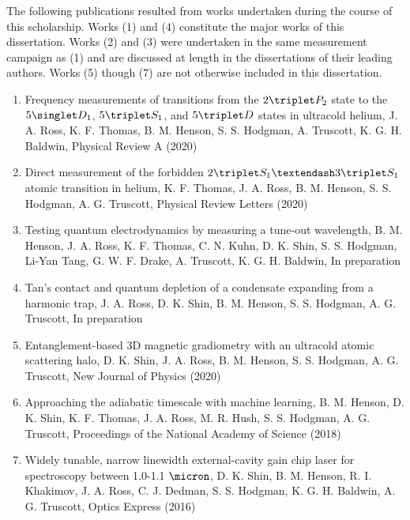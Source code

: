 The following publications resulted from works undertaken during the course of this scholarship. Works (1) and (4) constitute the major works of this dissertation. Works (2) and (3) were undertaken in the same measurement campaign as (1) and are discussed at length in the dissertations of their leading authors. Works (5) though (7) are not otherwise included in this dissertation.

\begin{enumerate}
\item{Frequency measurements of transitions from the $2\triplet P_2$ state to the $5 \singlet D_1$, $5\triplet S_1$, and $5\triplet D$ states in ultracold helium, J. A. Ross, K. F. Thomas, B. M. Henson, S. S. Hodgman, A. Truscott, K. G. H. Baldwin, {Physical Review A} (2020) }
\item{Direct measurement of the forbidden $2\triplet S_1 – 3\triplet S_1$ atomic transition in helium,  K. F. Thomas, J. A. Ross, B. M. Henson, S. S. Hodgman, A. G. Truscott, {Physical Review Letters} (2020)}
\item{Testing quantum electrodynamics by measuring a \mhe tune-out wavelength, B. M. Henson, J. A. Ross, K. F. Thomas, C. N. Kuhn, D. K. Shin, S. S. Hodgman, Li-Yan Tang, G. W. F. Drake, A. Truscott, K. G. H. Baldwin, {In preparation}}
\item{Tan's contact and quantum depletion of a condensate expanding from a harmonic trap, J. A. Ross, D. K. Shin, B. M. Henson, S. S. Hodgman, A. G. Truscott, {In preparation}}
\item{Entanglement-based 3D magnetic gradiometry with an ultracold atomic scattering halo, D. K. Shin, J. A. Ross, B. M. Henson, S. S. Hodgman, A. G. Truscott, New Journal of Physics (2020)}
\item{Approaching the adiabatic timescale with machine learning, B. M. Henson, D. K. Shin, K. F. Thomas, J. A. Ross, M. R. Hush, S. S. Hodgman, A. G. Truscott, {Proceedings of the National Academy of Science} (2018)}
\item{Widely tunable, narrow linewidth external-cavity gain chip laser for spectroscopy between 1.0-1.1 $\micron$, D. K. Shin, B. M. Henson, R. I.  Khakimov, J. A. Ross, C. J.  Dedman, S. S.  Hodgman, K. G. H.  Baldwin, A. G.  Truscott, {Optics Express} (2016)}
\end{enumerate}













